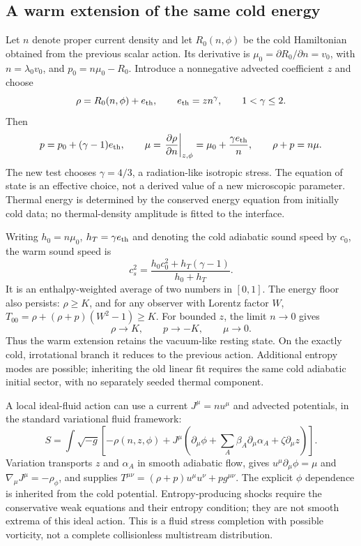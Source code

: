 \subsection{A warm extension of the same cold energy}
Let $n$ denote proper current density and let $R_0(n,\phi)$ be the cold
Hamiltonian obtained from the previous scalar action. Its derivative is
$\mu_0=\partial R_0/\partial n=v_0$, with
$n=\lambda_0v_0$, and $p_0=n\mu_0-R_0$. Introduce a nonnegative advected
coefficient $z$ and choose
\begin{equation}\label{eq:warm}
 \rho=R_0(n,\phi)+e_{\rm th},\qquad
 e_{\rm th}=z n^\gamma,\qquad 1<\gamma\le2.
\end{equation}
Then
\begin{equation}
 p=p_0+(\gamma-1)e_{\rm th},\qquad
 \mu=\left.\frac{\partial\rho}{\partial n}\right|_{z,\phi}
     =\mu_0+\frac{\gamma e_{\rm th}}n,
 \qquad \rho+p=n\mu.
\end{equation}
The new test chooses $\gamma=4/3$, a radiation-like isotropic stress.
The equation of state is an effective choice, not a derived value of a new
microscopic parameter. Thermal energy is determined by the conserved
energy equation from initially cold data; no thermal-density amplitude is
fitted to the interface.

Writing $h_0=n\mu_0$, $h_T=\gamma e_{\rm th}$ and denoting the cold
adiabatic sound speed by $c_0$, the warm sound speed is
\begin{equation}\label{eq:warmsound}
 c_s^2=\frac{h_0c_0^2+h_T(\gamma-1)}{h_0+h_T}.
\end{equation}
It is an enthalpy-weighted average of two numbers in $[0,1]$.
The energy floor also persists: $\rho\ge K$, and for any observer with
Lorentz factor $W$, $T_{00}=\rho+(\rho+p)(W^2-1)\ge K$.
For bounded $z$, the limit $n\to0$ gives
\begin{equation}
 \rho\to K,\qquad p\to-K,\qquad \mu\to0.
\end{equation}
Thus the warm extension retains the vacuum-like resting state. On the
exactly cold, irrotational branch it reduces to the previous action.
Additional entropy modes are possible; inheriting the old linear fit
requires the same cold adiabatic initial sector, with no separately seeded
thermal component.

A local ideal-fluid action can use a current $J^\mu=nu^\mu$ and advected
potentials, in the standard variational fluid framework\cite{Brown}:
\begin{equation}\label{eq:fluidaction}
 S=\int\sqrt{-g}\left[-\rho(n,z,\phi)
 +J^\mu\left(\partial_\mu\phi+
       \sum_A\beta_A\partial_\mu\alpha_A+\zeta\partial_\mu z\right)\right].
\end{equation}
Variation transports $z$ and $\alpha_A$ in smooth adiabatic flow, gives
$u^\mu\partial_\mu\phi=\mu$ and
$\nabla_\mu J^\mu=-\rho_\phi$, and supplies
$T^{\mu\nu}=(\rho+p)u^\mu u^\nu+pg^{\mu\nu}$.
The explicit $\phi$ dependence is inherited from the cold potential.
Entropy-producing shocks require the conservative weak equations and their
entropy condition; they are not smooth extrema of this ideal action.
This is a fluid stress completion with possible vorticity, not a complete
collisionless multistream distribution.

